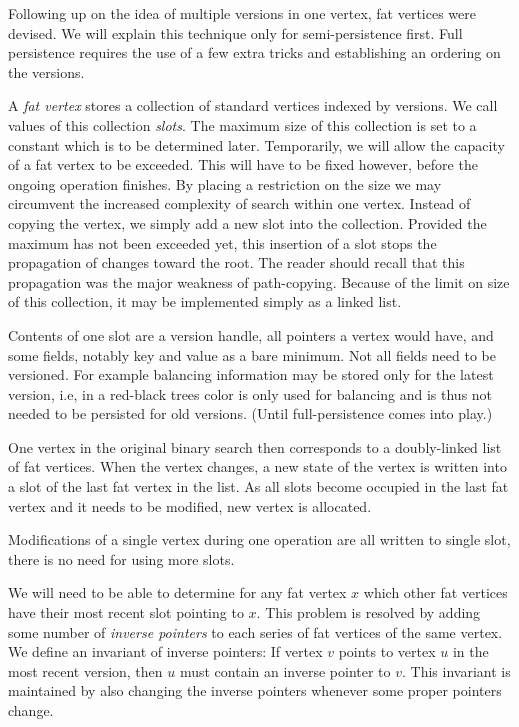 Following up on the idea of multiple versions in one vertex, fat vertices were devised. 
We will explain this technique only for semi-persistence first. 
Full persistence requires the use of a few extra tricks and establishing an ordering on the versions.

A \emph{fat vertex} stores a collection of standard vertices indexed by versions. 
We call values of this collection \emph{slots}. 
The maximum size of this collection is set to a constant which is to be determined later. 
Temporarily, we will allow the capacity of a fat vertex to be exceeded. 
This will have to be fixed however, before the ongoing operation finishes.
By placing a restriction on the size we may circumvent the increased complexity of search within one vertex.
Instead of copying the vertex, we simply add a new slot into the collection. 
Provided the maximum has not been exceeded yet, this insertion of a slot stops the propagation of changes toward the root. 
The reader should recall that this propagation was the major weakness of path-copying.
Because of the limit on size of this collection, it may be implemented simply as a linked list.

Contents of one slot are a version handle, all pointers a vertex would have, and some fields, notably key and value as a bare minimum.
Not all fields need to be versioned. 
For example balancing information may be stored only for the latest version, i.e, in a red-black trees color is only used for balancing and is thus not needed to be persisted for old versions. 
(Until full-persistence comes into play.)

One vertex in the original binary search then corresponds to a doubly-linked list of fat vertices.
When the vertex changes, a new state of the vertex is written into a slot of the last fat vertex in the list. 
As all slots become occupied in the last fat vertex and it needs to be modified, new vertex is allocated.

Modifications of a single vertex during one operation are all written to single slot, there is no need for using more slots.

We will need to be able to determine for any fat vertex $x$ which other fat vertices have their most recent slot pointing to $x$. 
This problem is resolved by adding some number of \emph{inverse pointers} to each series of fat vertices of the same vertex. 
We define an invariant of inverse pointers: If vertex $v$ points to vertex $u$ in the most recent version, then $u$ must contain an inverse pointer to $v$. This invariant is maintained by also changing the inverse pointers whenever some proper pointers change. 

